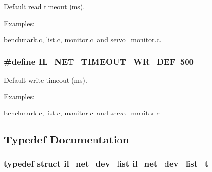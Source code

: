 Default read timeout (ms). 

\begin{Desc}
\item[Examples\+: ]\par
\hyperlink{benchmark_8c-example}{benchmark.\+c}, \hyperlink{list_8c-example}{list.\+c}, \hyperlink{monitor_8c-example}{monitor.\+c}, and \hyperlink{servo_monitor_8c-example}{servo\+\_\+monitor.\+c}.\end{Desc}
\subsubsection[{\texorpdfstring{I\+L\+\_\+\+N\+E\+T\+\_\+\+T\+I\+M\+E\+O\+U\+T\+\_\+\+W\+R\+\_\+\+D\+EF}{IL_NET_TIMEOUT_WR_DEF}}]{\setlength{\rightskip}{0pt plus 5cm}\#define I\+L\+\_\+\+N\+E\+T\+\_\+\+T\+I\+M\+E\+O\+U\+T\+\_\+\+W\+R\+\_\+\+D\+EF~500}\hypertarget{group__IL__NET_gaf43b0714cfed3be5907c593e18d4481d}{}\label{group__IL__NET_gaf43b0714cfed3be5907c593e18d4481d}


Default write timeout (ms). 

\begin{Desc}
\item[Examples\+: ]\par
\hyperlink{benchmark_8c-example}{benchmark.\+c}, \hyperlink{list_8c-example}{list.\+c}, \hyperlink{monitor_8c-example}{monitor.\+c}, and \hyperlink{servo_monitor_8c-example}{servo\+\_\+monitor.\+c}.\end{Desc}


\subsection{Typedef Documentation}
\subsubsection[{\texorpdfstring{il\+\_\+net\+\_\+dev\+\_\+list\+\_\+t}{il_net_dev_list_t}}]{\setlength{\rightskip}{0pt plus 5cm}typedef struct {\bf il\+\_\+net\+\_\+dev\+\_\+list}  {\bf il\+\_\+net\+\_\+dev\+\_\+list\+\_\+t}}\hypertarget{group__IL__NET_ga9c0173ee0e17218e9f6dcc5ae0a6f74d}{}\label{group__IL__NET_ga9c0173ee0e17218e9f6dcc5ae0a6f74d}


